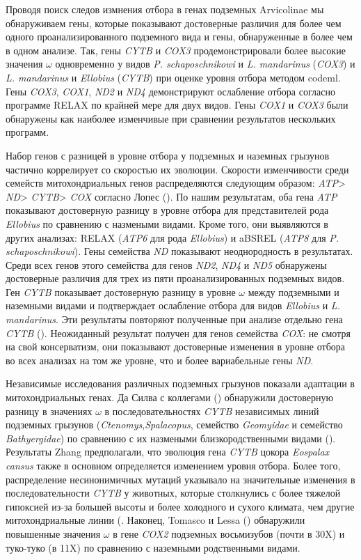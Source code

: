 Проводя поиск следов измнения отбора в генах подземных Arvicolinae мы обнаруживаем гены, которые показывают достоверные различия для более чем одного проанализированного подземного вида и гены, обнаруженные в более чем в одном анализе. Так, гены \textit{CYTB} и \textit{COX3} продемонстрировали более высокие значения $\omega$ одновременно у видов \textit{P. schaposchnikowi} и \textit{L. mandarinus} (\textit{COX3}) и \textit{L. mandarinus} и \textit{Ellobius} (\textit{CYTB}) при оценке уровня отбора методом codeml. Гены \textit{COX3}, \textit{COX1}, \textit{ND2} и \textit{ND4} демонстрируют ослабление отбора согласно программе RELAX по крайней мере для двух видов. Гены \textit{COX1} и \textit{COX3} были обнаружены как наиболее изменчивые при сравнении результатов нескольких программ. 


Набор генов с разницей в уровне отбора у подземных и наземных грызунов частично коррелирует со скоростью их эволюции. Скорости изменчивости среди семейств митохондриальных генов распределяются следующим образом: \textit{ATP}> \textit{ND}> \textit{CYTB}> \textit{COX} согласно Лопес (\cite{Lopez1997}). По нашим результатам, оба гена \textit{ATP} показывают достоверную разницу в уровне отбора для представителей рода \textit{Ellobius} по сравнению с назмеными видами. Кроме того, они выявляются в других анализах: RELAX (\textit{ATP6} для рода \textit{Ellobius}) и aBSREL (\textit{ATP8} для \textit{P. schaposchnikowi}). Гены семейства \textit{ND} показывают неоднородность в результатах. Среди всех генов этого семейства для генов \textit{ND2}, \textit{ND4} и \textit{ND5} обнаружены достоверные различия для трех из пяти проанализированных подземных видов. Ген \textit{CYTB} показывает достоверную разницу в уровне $\omega$ между подземными и наземными видами и подтверждает ослабление отбора для видов \textit{Ellobius} и \textit{L. mandarinus}. Эти результаты повторяют полученные при анализе отдельно гена \textit{CYTB} (\cite{Bondareva2021}). Неожиданный результат получен для генов семейства \textit{COX}: не смотря на свой консерватизм, они показывают достоверные изменения в уровне отбора во всех анализах на том же уровне, что и более вариабельные гены \textit{ND}.


Независимые исследования различных подземных грызунов показали адаптации в митохондриальных генах. Да Силва с коллегами (\cite{DaSilva2009}) обнаружили достоверную разницу в значениях $\omega$ в последовательностях \textit{CYTB} независимых линий подземных грызунов (\textit{Ctenomys},\textit{Spalacopus}, семейство \textit{Geomyidae} и семейство \textit{Bathyergidae}) по сравнению с их назмеными близкородственными видами (\cite{Tomasco2014}). Результаты Zhang предполагали, что эволюция гена \textit{CYTB} цокора \textit{Eospalax cansus} также в основном определяется изменением уровня отбора. Более того, распределение несинонимичных мутаций указывало на значительные изменения в последовательности \textit{CYTB} у животных, которые столкнулись с более тяжелой гипоксией из-за большей высоты и более холодного и сухого климата, чем другие митохондриальные линии (\cite{Zhang2013a}. Наконец, Tomasco и Lessa (\cite{Tomasco2011}) обнаружили повышенные значения $\omega$ в гене \textit{COX2} подземных восьмизубов (почти в 30X) и туко-туко (в 11X) по сравнению с наземными родственными видами. 


